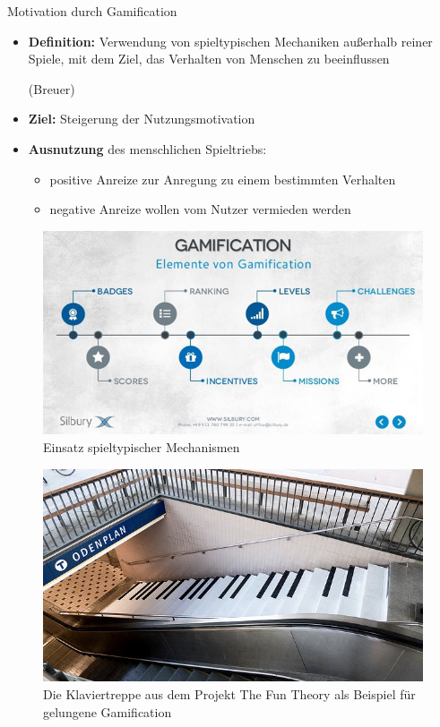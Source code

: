 \documentclass[final,20pt]{beamer}
\newlength{\colwidth}
\begin{document}
\begin{frame}[t]
\begin{columns}[t]
\begin{column}{\colwidth}
  \begin{alertblock}{Motivation durch Gamification}
  	\begin{itemize}
  		\item \textbf{Definition:} Verwendung von spieltypischen Mechaniken außerhalb reiner Spiele, mit dem Ziel, das Verhalten von Menschen zu beeinflussen \begin{small}(Breuer)\end{small}
  		\item \textbf{Ziel:} Steigerung der Nutzungsmotivation
  		\item \textbf{Ausnutzung} des menschlichen Spieltriebs:
  		\begin{itemize}
  			\item positive Anreize zur Anregung zu einem bestimmten Verhalten
  			\item negative Anreize wollen vom Nutzer vermieden werden
  		\end{itemize}  		
  	\end{itemize}
  \begin{figure}[H]
  	\centering
  	\includegraphics[width=0.65\colwidth]{pics/elements}
  	\caption{Einsatz spieltypischer Mechanismen}
  \end{figure}
  	\begin{figure}[H]
  		\centering
  		\includegraphics[width=0.65\colwidth]{pics/pianostairs}
  		\caption{ \centering Die Klaviertreppe aus dem Projekt The Fun Theory als Beispiel für gelungene Gamification}
  	\end{figure}
  \end{alertblock}


\end{column}
\end{columns}
\end{frame}
\end{document}
